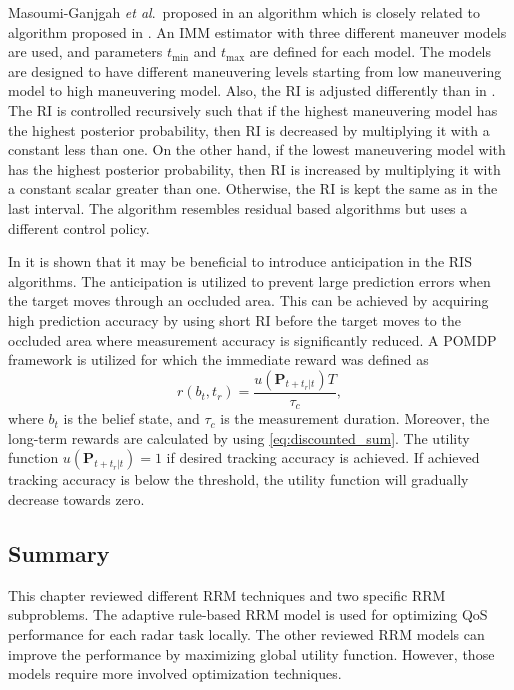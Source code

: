 \documentclass[english, 12pt, a4paper, elec, utf8, a-1b, online]{aaltothesis}
\renewcommand{\vec}[1]{\mathbf{#1}}
\newcommand{\etal}{\textit{et al}.~}
\newcommand{\tmax}{t_\text{max}}
\newcommand{\tmin}{t_\text{min}}
\newcommand{\ri}{t_r}
\begin{document}
Masoumi-Ganjgah \etal proposed in \cite{MasoumiGanjgah2017} an algorithm which is closely related to algorithm proposed in \cite{Benoudnine2006}.
An IMM estimator with three different maneuver models are used, and parameters $\tmin$ and $\tmax$ are defined for each model.
The models are designed to have different maneuvering levels starting from low maneuvering model to high maneuvering model.
Also, the RI is adjusted differently than in \cite{Benoudnine2006}.
The RI is controlled recursively such that if the highest maneuvering model has the highest posterior probability, then 
RI is decreased by multiplying it with a constant less than one.
On the other hand, if the lowest maneuvering model with has the highest posterior probability, then
RI is increased by multiplying it with a constant scalar greater than one.
Otherwise, the RI is kept the same as in the last interval.
The algorithm resembles residual based algorithms but uses a different control policy.

In \cite{Charlish2015} it is shown that it may be beneficial to introduce anticipation in the RIS algorithms.
The anticipation is utilized to prevent large prediction errors when the target moves through an occluded area.
This can be achieved by acquiring high prediction accuracy by using short RI before the target moves to the occluded area where measurement accuracy is significantly reduced.
A POMDP framework is utilized for which the immediate reward was defined as
\begin{equation}
    r(b_t, \ri) = \frac{u\left(\vec{P}_{t+\ri|t} \right) T}{\tau_c},
\end{equation}
where $b_t$ is the belief state, and $\tau_c$ is the measurement duration.
Moreover, the long-term rewards are calculated by using \eqref{eq:discounted_sum}.
The utility function $u\left(\vec{P}_{t+\ri|t} \right)=1$ if desired tracking accuracy is achieved.
If achieved tracking accuracy is below the threshold, the utility function will gradually decrease towards zero.


\subsection{Summary}

This chapter reviewed different RRM techniques and two specific RRM subproblems.
The adaptive rule-based RRM model is used for optimizing QoS performance for each radar task locally.
The other reviewed RRM models can improve the performance by maximizing global utility function.
However, those models require more involved optimization techniques.
\end{document}
